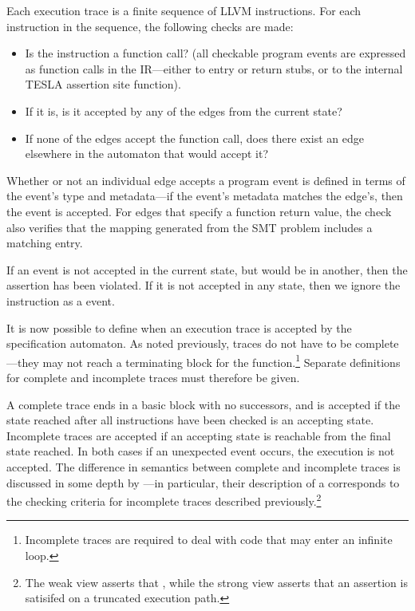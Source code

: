 Each execution trace is a finite sequence of LLVM instructions. For each
instruction in the sequence, the following checks are made:
\begin{itemize}
  \item Is the instruction a function call? (all checkable program events are
    expressed as function calls in the IR---either to entry or return stubs, or
    to the internal TESLA assertion site function).
  \item If it is, is it accepted by any of the edges from the current state?
  \item If none of the edges accept the function call, does there exist an edge
    elsewhere in the automaton that would accept it?
\end{itemize}

Whether or not an individual edge accepts a program event is defined in terms of
the event's type and metadata---if the event's metadata matches the edge's, then
the event is accepted. For edges that specify a function return value, the check
also verifies that the mapping generated from the SMT problem includes a
matching entry.

If an event is not accepted in the current state, but would be in another, then
the assertion has been violated. If it is not accepted in any state, then we
ignore the instruction as a  event.

It is now possible to define when an execution trace is accepted by the
specification automaton. As noted previously, traces do not have to be
complete---they may not reach a terminating block for the
function.\footnote{Incomplete traces are required to deal with code that may
enter an infinite loop.} Separate definitions for complete and incomplete traces
must therefore be given.

A complete trace ends in a basic block with no successors, and is accepted if
the state reached after all instructions have been checked is an accepting
state. Incomplete traces are accepted if an accepting state is reachable from
the final state reached. In both cases if an unexpected event occurs, the
execution is not accepted. The difference in semantics between complete and
incomplete traces is discussed in some depth by
\textcite{eisner_reasoning_2003}---in particular, their description of a
 corresponds to the checking criteria for incomplete traces
described previously.\footnote{The weak view asserts that
, while the
strong view asserts that an assertion is  satisifed on a
truncated execution path.}

